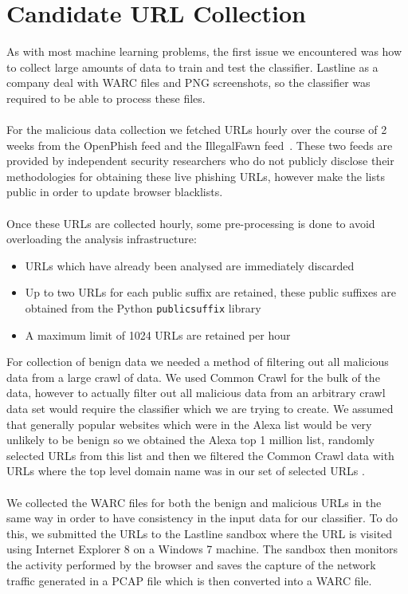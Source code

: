 \documentclass[12pt,twoside]{report}
\begin{document}
\section{Candidate URL Collection}
As with most machine learning problems, the first issue we encountered was how to collect large amounts of data to train and test the classifier. Lastline as a company deal with WARC files and PNG screenshots, so the classifier was required to be able to process these files.
\\\\
For the malicious data collection we fetched URLs hourly over the course of 2 weeks from the OpenPhish feed and the IllegalFawn feed~\cite{openphish}\cite{illegalfawn}. These two feeds are provided by independent security researchers who do not publicly disclose their methodologies for obtaining these live phishing URLs, however make the lists public in order to update browser blacklists.
\\\\
Once these URLs are collected hourly, some pre-processing is done to avoid overloading the analysis infrastructure:
\begin{itemize}
    \item URLs which have already been analysed are immediately discarded
    \item Up to two URLs for each public suffix are retained, these public suffixes are obtained from the Python \texttt{publicsuffix} library \cite{publicsuffix}
    \item A maximum limit of 1024 URLs are retained per hour
\end{itemize}
For collection of benign data we needed a method of filtering out all malicious data from a large crawl of data. We used Common Crawl for the bulk of the data, however to actually filter out all malicious data from an arbitrary crawl data set would require the classifier which we are trying to create. We assumed that generally popular websites which were in the Alexa list would be very unlikely to be benign so we obtained the Alexa top 1 million list, randomly selected URLs from this list and then we filtered the Common Crawl data with URLs where the top level domain name was in our set of selected URLs \cite{commoncrawl}\cite{alexa}.
\\\\
We collected the WARC files for both the benign and malicious URLs in the same way in order to have consistency in the input data for our classifier. To do this, we submitted the URLs to the Lastline sandbox where the URL is visited using Internet Explorer 8 on a Windows 7 machine. The sandbox then monitors the activity performed by the browser and saves the capture of the network traffic generated in a PCAP file which is then converted into a WARC file.
\end{document}
